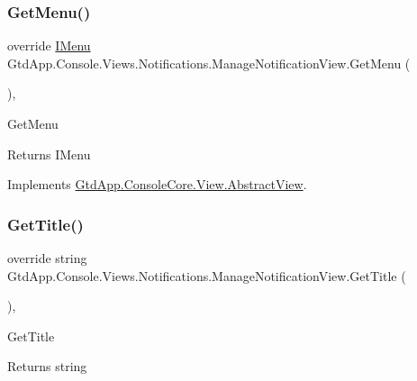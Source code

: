 \subsubsection{\texorpdfstring{Get\+Menu()}{GetMenu()}}
{\footnotesize\ttfamily override \mbox{\hyperlink{interface_gtd_app_1_1_console_core_1_1_menu_1_1_i_menu}{I\+Menu}} Gtd\+App.\+Console.\+Views.\+Notifications.\+Manage\+Notification\+View.\+Get\+Menu (\begin{DoxyParamCaption}{ }\end{DoxyParamCaption})\hspace{0.3cm}{\ttfamily [protected]}, {\ttfamily [virtual]}}



Get\+Menu 

\begin{DoxyReturn}{Returns}
I\+Menu
\end{DoxyReturn}


Implements \mbox{\hyperlink{class_gtd_app_1_1_console_core_1_1_view_1_1_abstract_view_a04360e549fc462f357300c59fa7fadab}{Gtd\+App.\+Console\+Core.\+View.\+Abstract\+View}}.

\mbox{\label{class_gtd_app_1_1_console_1_1_views_1_1_notifications_1_1_manage_notification_view_a400ecb489c2328d49e6cd13f4d60cb79}} 
\subsubsection{\texorpdfstring{Get\+Title()}{GetTitle()}}
{\footnotesize\ttfamily override string Gtd\+App.\+Console.\+Views.\+Notifications.\+Manage\+Notification\+View.\+Get\+Title (\begin{DoxyParamCaption}{ }\end{DoxyParamCaption})\hspace{0.3cm}{\ttfamily [protected]}, {\ttfamily [virtual]}}



Get\+Title 

\begin{DoxyReturn}{Returns}
string
\end{DoxyReturn}



